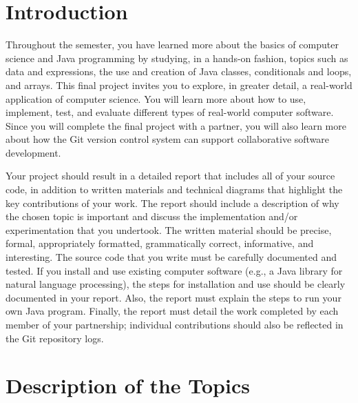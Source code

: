 


\usepackage[compact]{titlesec}



\section*{Introduction}

Throughout the semester, you have learned more about the basics of computer science and Java programming by studying, in
a hands-on fashion, topics such as data and expressions, the use and creation of Java classes, conditionals and loops,
and arrays.  This final project invites you to explore, in greater detail, a real-world application of computer science.
You will learn more about how to use, implement, test, and evaluate different types of real-world computer software.
Since you will complete the final project with a partner, you will also learn more about how the Git version control
system can support collaborative software development.

Your project should result in a detailed report that includes all of your source code, in addition to written materials
and technical diagrams that highlight the key contributions of your work.  The report should include a description of
why the chosen topic is important and discuss the implementation and/or experimentation that you undertook.  The written
material should be precise, formal, appropriately formatted, grammatically correct, informative, and interesting.  The
source code that you write must be carefully documented and tested.  If you install and use existing computer software
(e.g., a Java library for natural language processing),  the steps for installation and use should be clearly
documented in your report. Also, the report must explain the steps to run your own Java program.
Finally, the report must detail the work completed by each member of your partnership; individual contributions should
also be reflected in the Git repository logs.

\section*{Description of the Topics}

